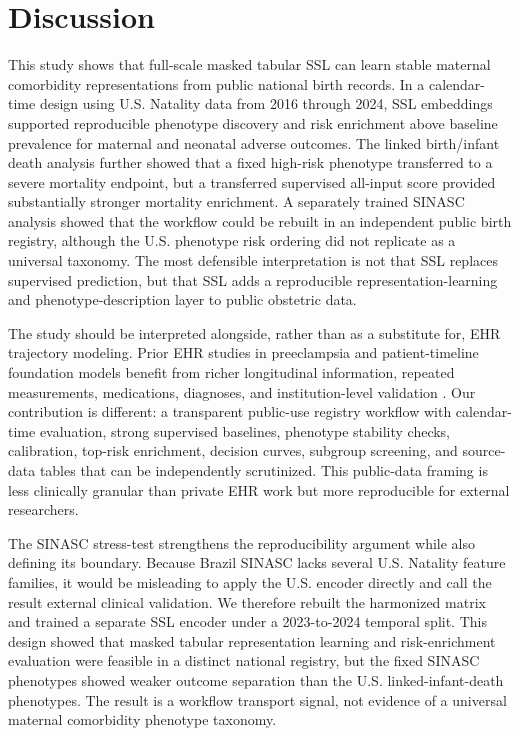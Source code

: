 \documentclass[pdflatex,sn-vancouver-num]{sn-jnl}
\begin{document}
\section{Discussion}\label{sec:discussion}

This study shows that full-scale masked tabular SSL can learn stable maternal comorbidity representations from public national birth records. In a calendar-time design using U.S. Natality data from 2016 through 2024, SSL embeddings supported reproducible phenotype discovery and risk enrichment above baseline prevalence for maternal and neonatal adverse outcomes. The linked birth/infant death analysis further showed that a fixed high-risk phenotype transferred to a severe mortality endpoint, but a transferred supervised all-input score provided substantially stronger mortality enrichment. A separately trained SINASC analysis showed that the workflow could be rebuilt in an independent public birth registry, although the U.S. phenotype risk ordering did not replicate as a universal taxonomy. The most defensible interpretation is not that SSL replaces supervised prediction, but that SSL adds a reproducible representation-learning and phenotype-description layer to public obstetric data.

The study should be interpreted alongside, rather than as a substitute for, EHR trajectory modeling. Prior EHR studies in preeclampsia and patient-timeline foundation models benefit from richer longitudinal information, repeated measurements, medications, diagnoses, and institution-level validation \cite{li2022preeclampsia_emr,yang2025preeclampsia_delivery,kraljevic2024foresight,yang2023transformehr,guo2024shared_ehr_foundation}. Our contribution is different: a transparent public-use registry workflow with calendar-time evaluation, strong supervised baselines, phenotype stability checks, calibration, top-risk enrichment, decision curves, subgroup screening, and source-data tables that can be independently scrutinized. This public-data framing is less clinically granular than private EHR work but more reproducible for external researchers.

The SINASC stress-test strengthens the reproducibility argument while also defining its boundary. Because Brazil SINASC lacks several U.S. Natality feature families, it would be misleading to apply the U.S. encoder directly and call the result external clinical validation. We therefore rebuilt the harmonized matrix and trained a separate SSL encoder under a 2023-to-2024 temporal split. This design showed that masked tabular representation learning and risk-enrichment evaluation were feasible in a distinct national registry, but the fixed SINASC phenotypes showed weaker outcome separation than the U.S. linked-infant-death phenotypes. The result is a workflow transport signal, not evidence of a universal maternal comorbidity phenotype taxonomy.
\end{document}
